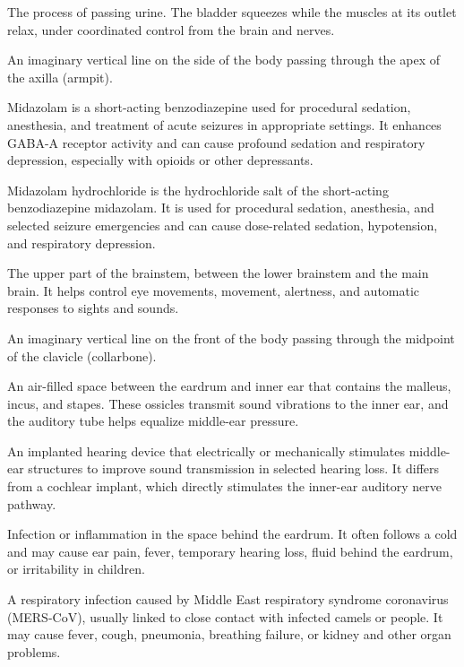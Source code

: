  The process of passing urine. The bladder squeezes while the muscles at its outlet relax, under coordinated control from the brain and nerves.

 An imaginary vertical line on the side of the body passing through the apex of the
axilla (armpit).

 Midazolam is a short-acting benzodiazepine used for procedural sedation, anesthesia, and treatment of acute seizures in appropriate settings. It enhances GABA-A receptor activity and can cause profound sedation and respiratory depression, especially with opioids or other depressants.

 Midazolam hydrochloride is the hydrochloride salt of the short-acting benzodiazepine midazolam. It is used for procedural sedation, anesthesia, and selected seizure emergencies and can cause dose-related sedation, hypotension, and respiratory depression.

 The upper part of the brainstem, between the lower brainstem and the main brain. It helps control eye movements, movement, alertness, and automatic responses to sights and sounds.

 An imaginary vertical line on the front of the body passing through the midpoint of the
clavicle (collarbone).

 An air-filled space between the eardrum and inner ear that contains the malleus, incus, and stapes. These ossicles transmit
sound vibrations to the inner ear, and the auditory tube helps equalize middle-ear
pressure.

 An implanted hearing device that electrically or mechanically stimulates middle-ear structures to improve sound transmission in selected hearing loss. It differs from a cochlear implant, which directly stimulates the inner-ear auditory nerve pathway.

 Infection or inflammation in the space behind the eardrum. It often follows a cold and may cause ear pain, fever, temporary hearing loss, fluid behind the eardrum, or irritability in children.

 A respiratory infection caused by Middle East respiratory syndrome coronavirus (MERS-CoV), usually linked to close contact with infected camels or people. It may cause fever, cough, pneumonia, breathing failure, or kidney and other organ problems.

